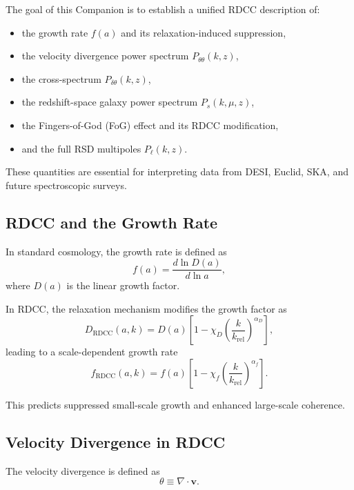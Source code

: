 \documentclass[11pt,a4paper]{article}
\begin{document}
The goal of this Companion is to establish a unified RDCC description of:
\begin{itemize}
\item the growth rate $f(a)$ and its relaxation-induced suppression,
\item the velocity divergence power spectrum $P_{\theta\theta}(k,z)$,
\item the cross-spectrum $P_{\delta\theta}(k,z)$,
\item the redshift-space galaxy power spectrum $P_{s}(k,\mu,z)$,
\item the Fingers-of-God (FoG) effect and its RDCC modification,
\item and the full RSD multipoles $P_{\ell}(k,z)$.
\end{itemize}

These quantities are essential for interpreting data from DESI, Euclid, SKA, and future
spectroscopic surveys.

\subsection{RDCC and the Growth Rate}

In standard cosmology, the growth rate is defined as
\begin{equation}
f(a)
=
\frac{d\ln D(a)}{d\ln a},
\end{equation}
where $D(a)$ is the linear growth factor.

In RDCC, the relaxation mechanism modifies the growth factor as
\begin{equation}
D_{\mathrm{RDCC}}(a,k)
=
D(a)
\left[
1
-
\chi_{D}
\left(
\frac{k}{k_{\mathrm{rel}}}
\right)^{\alpha_{D}}
\right],
\end{equation}
leading to a scale-dependent growth rate
\begin{equation}
f_{\mathrm{RDCC}}(a,k)
=
f(a)
\left[
1
-
\chi_{f}
\left(
\frac{k}{k_{\mathrm{rel}}}
\right)^{\alpha_{f}}
\right].
\end{equation}

This predicts suppressed small-scale growth and enhanced large-scale coherence.

\subsection{Velocity Divergence in RDCC}

The velocity divergence is defined as
\begin{equation}
\theta
\equiv
\nabla \cdot \mathbf{v}.
\end{equation}
\end{document}
